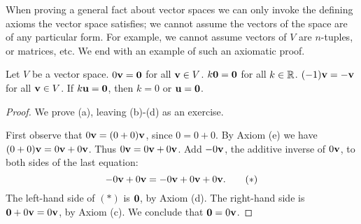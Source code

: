 \begin{frame}
When proving a general fact about vector spaces we can only invoke the defining axioms the vector space satisfies; we cannot assume the vectors of the space are of any particular form. For example, we cannot assume vectors of $V$ are $n$-tuples, or matrices, etc. 
\bspace 
We end with an example of such an axiomatic proof. 
\bpause
\begin{theorem}
Let $V$ be a vector space. 
\bb[(a)]
\ii $0{\mathbf v}={\mathbf 0}$ for all ${\mathbf v}\in V$. 
\ii $k{\mathbf 0}={\mathbf 0}$ for all $k\in {\mathbb R}$. 
\ii $(-1){\mathbf v}=-{\mathbf v}$ for all ${\mathbf v}\in V$. 
\ii If $k{\mathbf u}={\mathbf 0}$, then $k=0$ or ${\mathbf u}={\mathbf 0}$. 
\ee
\end{theorem}
\pause
\begin{proof}
We prove (a), leaving (b)-(d) as an exercise. 

First observe that $0{\mathbf v}=(0+0){\mathbf v}$, since $0=0+0$. 
\bpause
By Axiom (e) we have $(0+0){\mathbf v}=0{\mathbf v}+0{\mathbf v}$. Thus $0{\mathbf v}=0{\mathbf v}+0{\mathbf v}$.  
\bpause 
Add $-0{\mathbf v}$, the additive inverse of $0{\mathbf v}$, to both sides of the last equation:
\[
-0{\mathbf v}+0{\mathbf v}=-0{\mathbf v}+0{\mathbf v}+0{\mathbf v}.\tag{$*$}
\]
The left-hand side of $(*)$ is ${\mathbf 0}$, by Axiom (d). The right-hand side is ${\mathbf 0}+0{\mathbf v}=0{\mathbf v}$, by Axiom (c). We conclude that ${\mathbf 0}=0{\mathbf v}$. 
 \end{proof}
\end{frame}
